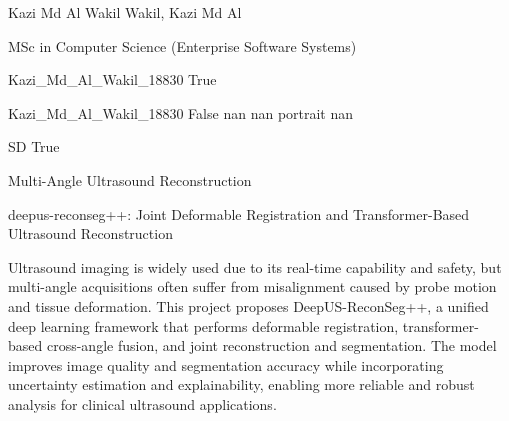 \documentclass[twoside]{report}
\begin{document}
\begingroup{}\relax



\def\Key{Kazi_Md_Al_Wakil_18830}

{Kazi Md Al Wakil}
{Wakil, Kazi Md Al}

{MSc in Computer Science (Enterprise Software Systems)}

{Kazi_Md_Al_Wakil_18830}
{True}

{Kazi_Md_Al_Wakil_18830}
{False}
{nan}
{nan}
{portrait}
{nan}

{SD}
{True}

{Multi-Angle Ultrasound Reconstruction}

{deepus-reconseg++: Joint Deformable Registration and Transformer-Based Ultrasound Reconstruction}

{Ultrasound imaging is widely used due to its real-time capability and safety, but multi-angle acquisitions often suffer from misalignment caused by probe motion and tissue deformation. This project proposes DeepUS-ReconSeg++, a unified deep learning framework that performs deformable registration, transformer-based cross-angle fusion, and joint reconstruction and segmentation. The model improves image quality and segmentation accuracy while incorporating uncertainty estimation and explainability, enabling more reliable and robust analysis for clinical ultrasound applications.}
\end{document}
